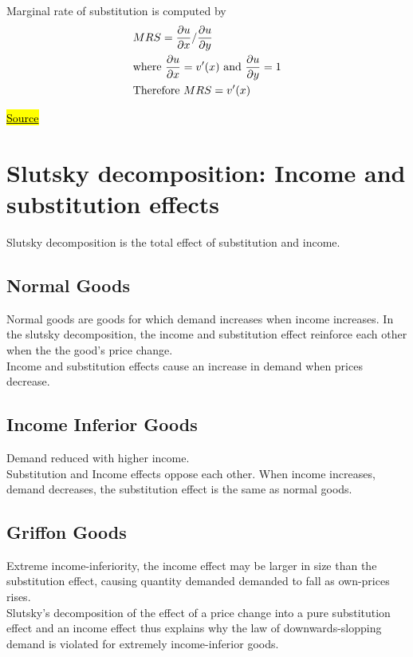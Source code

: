 \documentclass[a4paper, 12pt, reqno]{article}
\begin{document}
Marginal rate of substitution is computed by 
\begin{equation}
    \begin{split}       
    &MRS =\frac{\partial u}{\partial x} / \frac{\partial u}{ \partial y } \\
    &\mbox{where } \frac{\partial u}{\partial x}=v'(x) \mbox{ and } \frac{\partial u}{\partial y} = 1 \\
    &\mbox{Therefore } MRS = v'(x)
    \notag
    \end{split}    
\end{equation}

\href{https://www.core-econ.org/the-economy/book/text/leibniz-05-04-01.html}{\hl{Source}}

\section{Slutsky decomposition: Income and substitution effects}
Slutsky decomposition is the total effect of substitution and income. 

\subsection{Normal Goods}
Normal goods are goods for which demand increases when income increases. 
In the slutsky decomposition, the income and substitution effect reinforce each other when the the good's price change. \\
Income and substitution effects cause an increase in demand when prices decrease. 

\subsection{Income Inferior Goods}
Demand reduced with higher income. \\
Substitution and Income effects oppose each other. When income increases, demand decreases, the substitution effect is the same as normal goods. 

\subsection{Griffon Goods}
Extreme income-inferiority, the income effect may be larger in size than the substitution effect, causing quantity demanded  
demanded to fall as own-prices rises. \\
Slutsky's decomposition of the effect of a price change into a pure substitution effect and an income effect thus explains why the law of downwards-slopping
demand is violated for extremely income-inferior goods.  
\end{document}
